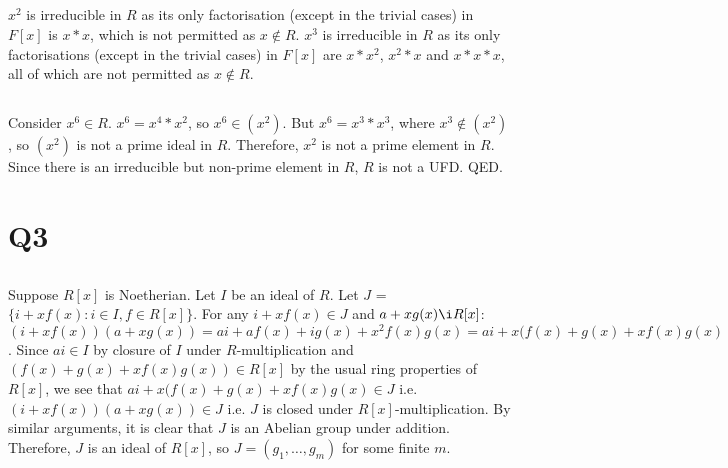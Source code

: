 \documentclass[]{article}
\begin{document}
\subsection*{}
$x^2$ is irreducible in $R$ as its only factorisation (except in the trivial cases) in $F[x]$ is $x*x$, which is not permitted as $x \not\in R$.\newline
$x^3$ is irreducible in $R$ as its only factorisations (except in the trivial cases) in $F[x]$ are $x*x^2$, $x^2*x$ and $x*x*x$, all of which are not permitted as $x \not\in R$.

\subsection*{}
Consider $x^6 \in R$.\newline
$x^6 = x^4*x^2$, so $x^6 \in (x^2)$.\newline
But $x^6 = x^3*x^3$, where $x^3 \not\in (x^2)$, so $(x^2)$ is not a prime ideal in $R$.\newline
Therefore, $x^2$ is not a prime element in $R$.\newline
Since there is an irreducible but non-prime element in $R$, $R$ is not a UFD. QED.


\section*{Q3}
\subsection*{}
Suppose $R[x]$ is Noetherian.\newline
Let $I$ be an ideal of $R$.\newline
Let $J$ = $\{ i + xf(x) : i \in I, f \in R[x] \}$.\newline
For any $i + xf(x) \in J$ and $a + xg(x) \i R[x]$:\newline
$(i + xf(x))(a + xg(x)) = ai + af(x) + ig(x) + x^2f(x)g(x) = ai + x(f(x) + g(x) + xf(x)g(x)$.
Since $ai \in I$ by closure of $I$ under $R$-multiplication and $(f(x) + g(x) + xf(x)g(x)) \in R[x]$ by the usual ring properties of $R[x]$, we see that $ai + x(f(x) + g(x) + xf(x)g(x) \in J$ i.e. $(i + xf(x))(a + xg(x)) \in J$ i.e. $J$ is closed under $R[x]$-multiplication.\newline
By similar arguments, it is clear that $J$ is an Abelian group under addition.\newline
Therefore, $J$ is an ideal of $R[x]$, so $J = (g_1, \dots, g_m)$ for some finite $m$.

\subsection*{}
\end{document}
